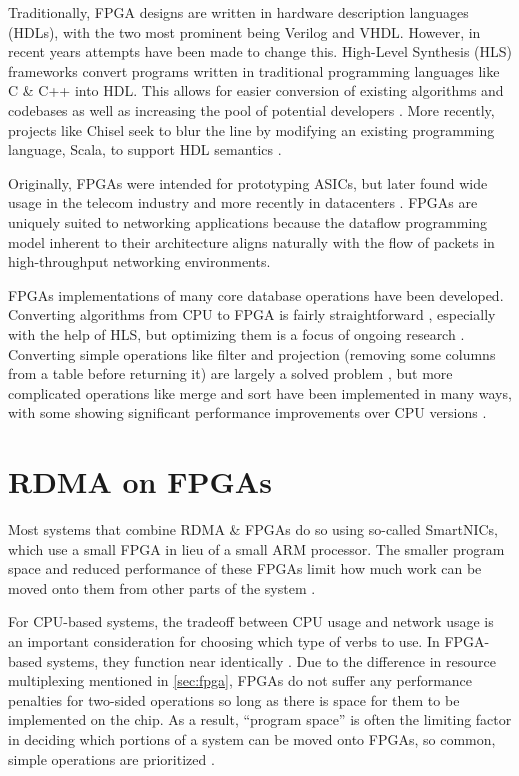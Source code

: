Traditionally, FPGA designs are written in hardware description languages (HDLs), with the two most prominent being Verilog and VHDL. However, in recent years attempts have been made to change this. High-Level Synthesis (HLS) frameworks convert programs written in traditional programming languages like C \& C++ into HDL. This allows for easier conversion of existing algorithms and codebases as well as increasing the pool of potential developers \autocite{martin-destest-2009}. More recently, projects like Chisel seek to blur the line by modifying an existing programming language, Scala, to support HDL semantics \autocite{chisel}.

Originally, FPGAs were intended for prototyping ASICs, but later found wide usage in the telecom industry \autocite{bobda-trets-2022,mencer-queue-2020} and more recently in datacenters \autocite{mencer-queue-2020,hoozemans-cas-2021}. FPGAs are uniquely suited to networking applications because the dataflow programming model \autocite{hoozemans-cas-2021} inherent to their architecture aligns naturally with the flow of packets in high-throughput networking environments.

FPGAs implementations of many core database operations have been developed. Converting algorithms from CPU to FPGA is fairly straightforward \autocite{fang-vldb-2020}, especially with the help of HLS, but optimizing them is a focus of ongoing research \autocite{fang-vldb-2020}. Converting simple operations like filter and projection (removing some columns from a table before returning it) are largely a solved problem \autocite{fang-vldb-2020}, but more complicated operations like merge and sort have been implemented in many ways, with some showing significant performance improvements over CPU versions \autocite{leggett-trets-2025,moghaddamfar-damon-2021}.


\section{RDMA on FPGAs}
\label{sec:rdma-fpga}

Most systems that combine RDMA \& FPGAs do so using so-called SmartNICs, which use a small FPGA in lieu of a small ARM processor. The smaller program space and reduced performance of these FPGAs limit how much work can be moved onto them from other parts of the system \autocite{honeycomb}.

For CPU-based systems, the tradeoff between CPU usage and network usage is an important consideration for choosing which type of verbs to use. In FPGA-based systems, they function near identically \autocite{strom}. Due to the difference in resource multiplexing mentioned in \autoref{sec:fpga}, FPGAs do not suffer any performance penalties for two-sided operations so long as there is space for them to be implemented on the chip. As a result, ``program space'' is often the limiting factor in deciding which portions of a system can be moved onto FPGAs, so common, simple operations are prioritized \autocite{honeycomb,moghaddamfar-damon-2021}.

